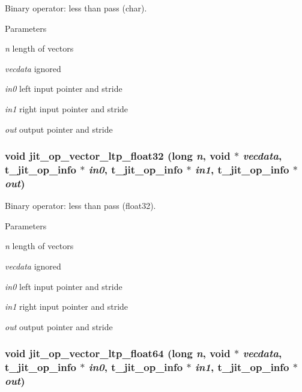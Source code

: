 Binary operator: less than pass (char). 
\begin{DoxyParams}{Parameters}
\item[{\em n}]length of vectors \item[{\em vecdata}]ignored \item[{\em in0}]left input pointer and stride \item[{\em in1}]right input pointer and stride \item[{\em out}]output pointer and stride \end{DoxyParams}
\hypertarget{group__opvecmod_ga3cfd2857a5964e63449d406452e303fb}{
\subsubsection[{jit\_\-op\_\-vector\_\-ltp\_\-float32}]{\setlength{\rightskip}{0pt plus 5cm}void jit\_\-op\_\-vector\_\-ltp\_\-float32 (long {\em n}, \/  void $\ast$ {\em vecdata}, \/  {\bf t\_\-jit\_\-op\_\-info} $\ast$ {\em in0}, \/  {\bf t\_\-jit\_\-op\_\-info} $\ast$ {\em in1}, \/  {\bf t\_\-jit\_\-op\_\-info} $\ast$ {\em out})}}
\label{group__opvecmod_ga3cfd2857a5964e63449d406452e303fb}


Binary operator: less than pass (float32). 
\begin{DoxyParams}{Parameters}
\item[{\em n}]length of vectors \item[{\em vecdata}]ignored \item[{\em in0}]left input pointer and stride \item[{\em in1}]right input pointer and stride \item[{\em out}]output pointer and stride \end{DoxyParams}
\hypertarget{group__opvecmod_gaea3f3f7bdd97812e3023939a957ddbbf}{
\subsubsection[{jit\_\-op\_\-vector\_\-ltp\_\-float64}]{\setlength{\rightskip}{0pt plus 5cm}void jit\_\-op\_\-vector\_\-ltp\_\-float64 (long {\em n}, \/  void $\ast$ {\em vecdata}, \/  {\bf t\_\-jit\_\-op\_\-info} $\ast$ {\em in0}, \/  {\bf t\_\-jit\_\-op\_\-info} $\ast$ {\em in1}, \/  {\bf t\_\-jit\_\-op\_\-info} $\ast$ {\em out})}}
\label{group__opvecmod_gaea3f3f7bdd97812e3023939a957ddbbf}


